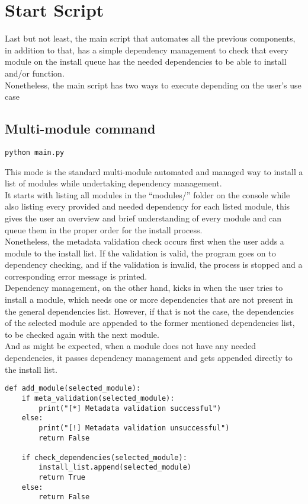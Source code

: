 \section{Start Script}
Last but not least, the main script that automates all the previous components, in addition to that, has a simple dependency management to check that every module on the install queue has the needed dependencies to be able to install and/or function.\\
Nonetheless, the main script has two ways to execute depending on the user’s use case

\subsection{Multi-module command}
\begin{lstlisting}[caption=Multi-module mode, style=pythonstyle]
python main.py
\end{lstlisting}

This mode is the standard multi-module automated and managed way to install a list of modules while undertaking dependency management.\\
It starts with listing all modules in the “modules/” folder on the console while also listing every provided and needed dependency for each listed module, this gives the user an overview and brief understanding of every module and can queue them in the proper order for the install process.\\
Nonetheless, the metadata validation check occurs first when the user adds a module to the install list. If the validation is valid, the program goes on to dependency checking, and if the validation is invalid, the process is stopped and a corresponding error message is printed.\\
Dependency management, on the other hand, kicks in when the user tries to install a module, which needs one or more dependencies that are not present in the general dependencies list.
However, if that is not the case, the dependencies of the selected module are appended to the former mentioned dependencies list, to be checked again with the next module.\\
And as might be expected, when a module does not have any needed dependencies, it passes dependency management and gets appended directly to the install list.\\

\begin{lstlisting}[caption=Adding Module, style=pythonstyle]
def add_module(selected_module):
    if meta_validation(selected_module):
        print("[*] Metadata validation successful")
    else:
        print("[!] Metadata validation unsuccessful")
        return False

    if check_dependencies(selected_module):
        install_list.append(selected_module)
        return True
    else:
        return False
\end{lstlisting}

